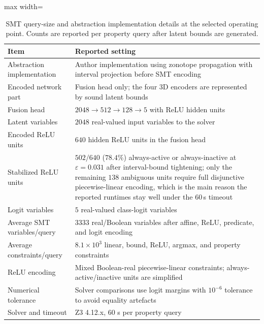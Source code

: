 \documentclass[preprint,11pt]{elsarticle}
\newcommand{\eps}{\varepsilon}
\begin{document}
\begin{table}[H]
\centering
\caption{SMT query-size and abstraction implementation details at the selected operating point. Counts are reported per property query after latent bounds are generated.}
\label{tab:smt_query_details}
\scriptsize
\begin{adjustbox}{max width=\textwidth}
\begin{tabular}{p{4.2cm}p{9.8cm}}
\toprule
\textbf{Item} & \textbf{Reported setting} \\
\midrule
Abstraction implementation & Author implementation using zonotope propagation with interval projection before SMT encoding \\
Encoded network part & Fusion head only; the four 3D encoders are represented by sound latent bounds \\
Fusion head & $2048\rightarrow512\rightarrow128\rightarrow5$ with ReLU hidden units \\
Latent variables & $2048$ real-valued input variables to the solver \\
Encoded ReLU units & $640$ hidden ReLU units in the fusion head \\
Stabilized ReLU units & $502/640$ ($78.4\%$) always-active or always-inactive at $\eps=0.031$ after interval-bound tightening; only the remaining $138$ ambiguous units require full disjunctive piecewise-linear encoding, which is the main reason the reported runtimes stay well under the 60\,s timeout \\
Logit variables & $5$ real-valued class-logit variables \\
Average SMT variables/query & $3333$ real/Boolean variables after affine, ReLU, predicate, and logit encoding \\
Average constraints/query & $8.1\times10^{3}$ linear, bound, ReLU, argmax, and property constraints \\
ReLU encoding & Mixed Boolean-real piecewise-linear constraints; always-active/inactive units are simplified \\
Numerical tolerance & Solver comparisons use logit margins with $10^{-6}$ tolerance to avoid equality artefacts \\
Solver and timeout & Z3 4.12.x, 60 s per property query \\
\bottomrule
\end{tabular}
\end{adjustbox}
\end{table}
\end{document}
